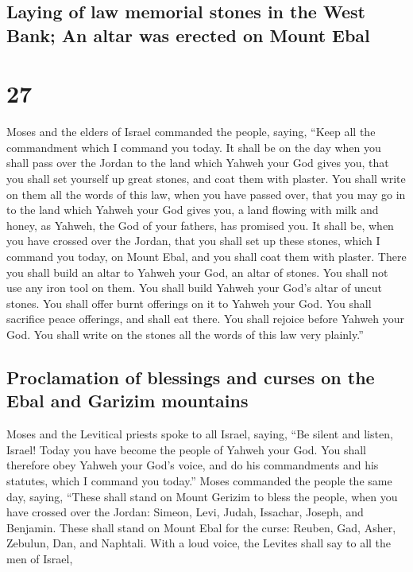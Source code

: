 \hypertarget{laying-of-law-memorial-stones-in-the-west-bank-an-altar-was-erected-on-mount-ebal}{%
\subsection{Laying of law memorial stones in the West Bank; An altar was
erected on Mount
Ebal}\label{laying-of-law-memorial-stones-in-the-west-bank-an-altar-was-erected-on-mount-ebal}}

\hypertarget{section-26}{%
\section{27}\label{section-26}}

 Moses and the elders of Israel commanded the people,
saying, ``Keep all the commandment which I command you today.
 It shall be on the day when you shall pass over the
Jordan to the land which Yahweh your God gives you, that you shall set
yourself up great stones, and coat them with plaster.  You
shall write on them all the words of this law, when you have passed
over, that you may go in to the land which Yahweh your God gives you, a
land flowing with milk and honey, as Yahweh, the God of your fathers,
has promised you.  It shall be, when you have crossed over
the Jordan, that you shall set up these stones, which I command you
today, on Mount Ebal, and you shall coat them with plaster.
 There you shall build an altar to Yahweh your God, an
altar of stones. You shall not use any iron tool on them. 
You shall build Yahweh your God's altar of uncut stones. You shall offer
burnt offerings on it to Yahweh your God.  You shall
sacrifice peace offerings, and shall eat there. You shall rejoice before
Yahweh your God.  You shall write on the stones all the
words of this law very plainly.''

\hypertarget{proclamation-of-blessings-and-curses-on-the-ebal-and-garizim-mountains}{%
\subsection{Proclamation of blessings and curses on the Ebal and Garizim
mountains}\label{proclamation-of-blessings-and-curses-on-the-ebal-and-garizim-mountains}}

 Moses and the Levitical priests spoke to all Israel,
saying, ``Be silent and listen, Israel! Today you have become the people
of Yahweh your God.  You shall therefore obey Yahweh your
God's voice, and do his commandments and his statutes, which I command
you today.''  Moses commanded the people the same day,
saying,  ``These shall stand on Mount Gerizim to bless
the people, when you have crossed over the Jordan: Simeon, Levi, Judah,
Issachar, Joseph, and Benjamin.  These shall stand on
Mount Ebal for the curse: Reuben, Gad, Asher, Zebulun, Dan, and
Naphtali.  With a loud voice, the Levites shall say to
all the men of Israel,


